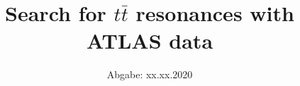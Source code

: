 

\subject{Lehrstuhlversuch im SS2020}
\title{Search for $t\bar{t}$ resonances with ATLAS data}
\date{%
  Abgabe: xx.xx.2020
}



\maketitle
\thispagestyle{empty}
\tableofcontents
\newpage


%




%


